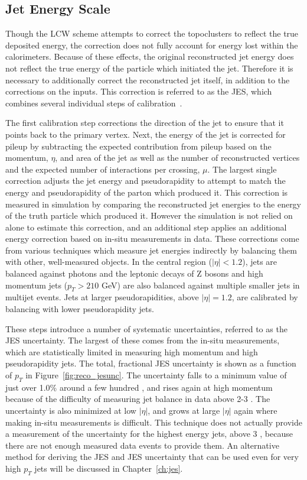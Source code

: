 \subsection{Jet Energy Scale}
\label{sec:reco_jes}

Though the \ac{LCW} scheme attempts to correct the topoclusters to reflect the true deposited energy, the correction does not fully account for energy lost within the calorimeters.
Because of these effects, the original reconstructed jet energy does not reflect the true energy of the particle which initiated the jet.
Therefore it is necessary to additionally correct the reconstructed jet itself, in addition to the corrections on the inputs.
This correction is referred to as the \ac{JES}, which combines several individual steps of calibration~\cite{ATLAS-CONF-2015-002}.

The first calibration step corrections the direction of the jet to ensure that it points back to the primary vertex.
Next, the energy of the jet is corrected for pileup by subtracting the expected contribution from pileup based on the momentum, $\eta$, and area of the jet as well as the number of reconstructed vertices and the expected number of interactions per crossing, $\mu$.
The largest single correction adjusts the jet energy and pseudorapidity to attempt to match the energy and pseudorapidity of the parton which produced it.
This correction is measured in simulation by comparing the reconstructed jet energies to the energy of the truth particle which produced it.
However the simulation is not relied on alone to estimate this correction, and an additional step applies an additional energy correction based on in-situ measurements in data.
These corrections come from various techniques which measure jet energies indirectly by balancing them with other, well-measured objects.
In the central region ($|\eta| < 1.2$), jets are balanced against photons and the leptonic decays of Z bosons and high momentum jets ($p_T > 210$ GeV) are also balanced against multiple smaller jets in multijet events.
Jets at larger pseudorapidities, above $|\eta| = 1.2$, are calibrated by balancing with lower pseudorapidity jets.

These steps introduce a number of systematic uncertainties, referred to as the \ac{JES} uncertainty.
The largest of these comes from the in-situ measurements, which are statistically limited in measuring high momentum and high pseudorapidity jets.
The total, fractional \ac{JES} uncertainty is shown as a function of $p_T$ in Figure~\ref{fig:reco_jesunc}.
The uncertainty falls to a minimum value of just over 1.0\% around a few hundred \GeV, and rises again at high momentum because of the difficulty of measuring jet balance in data above 2-3 \TeV.
The uncertainty is also minimized at low $|\eta|$, and grows at large $|\eta|$ again where making in-situ measurements is difficult.
This technique does not actually provide a measurement of the uncertainty for the highest energy jets, above 3 \TeV, because there are not enough measured data events to provide them.
An alternative method for deriving the \ac{JES} and \ac{JES} uncertainty that can be used even for very high $p_T$ jets will be discussed in Chapter~\ref{ch:jes}.


